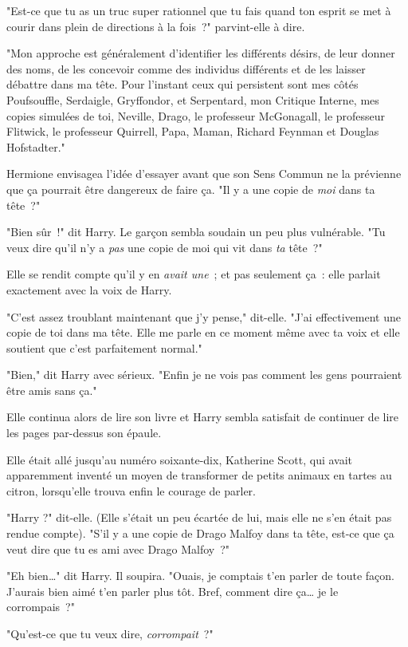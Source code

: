 "Est-ce que tu as un truc super rationnel que tu fais quand ton esprit se met à courir dans plein de directions à la fois~?" parvint-elle à dire.

"Mon approche est généralement d'identifier les différents désirs, de leur donner des noms, de les concevoir comme des individus différents et de les laisser débattre dans ma tête. Pour l'instant ceux qui persistent sont mes côtés Poufsouffle, Serdaigle, Gryffondor, et Serpentard, mon Critique Interne, mes copies simulées de toi, Neville, Drago, le professeur McGonagall, le professeur Flitwick, le professeur Quirrell, Papa, Maman, Richard Feynman et Douglas Hofstadter."

Hermione envisagea l'idée d'essayer avant que son Sens Commun ne la prévienne que ça pourrait être dangereux de faire ça. "Il y a une copie de \emph{moi} dans ta tête~?"

"Bien sûr~!" dit Harry. Le garçon sembla soudain un peu plus vulnérable. "Tu veux dire qu'il n'y a \emph{pas} une copie de moi qui vit dans \emph{ta} tête~?"

Elle se rendit compte qu'il y en \emph{avait une}~; et pas seulement ça~: elle parlait exactement avec la voix de Harry.

"C'est assez troublant maintenant que j'y pense," dit-elle. "J'ai effectivement une copie de toi dans ma tête. Elle me parle en ce moment même avec ta voix et elle soutient que c'est parfaitement normal."

"Bien," dit Harry avec sérieux. "Enfin je ne vois pas comment les gens pourraient être amis sans ça."

Elle continua alors de lire son livre et Harry sembla satisfait de continuer de lire les pages par-dessus son épaule.

Elle était allé jusqu'au numéro soixante-dix, Katherine Scott, qui avait apparemment inventé un moyen de transformer de petits animaux en tartes au citron, lorsqu'elle trouva enfin le courage de parler.

"Harry ?" dit-elle. (Elle s'était un peu écartée de lui, mais elle ne s'en était pas rendue compte). "S'il y a une copie de Drago Malfoy dans ta tête, est-ce que ça veut dire que tu es ami avec Drago Malfoy~?"

"Eh bien…" dit Harry. Il soupira. "Ouais, je comptais t'en parler de toute façon. J'aurais bien aimé t'en parler plus tôt. Bref, comment dire ça… je le corrompais~?"

"Qu'est-ce que tu veux dire, \emph{corrompait}~?"

